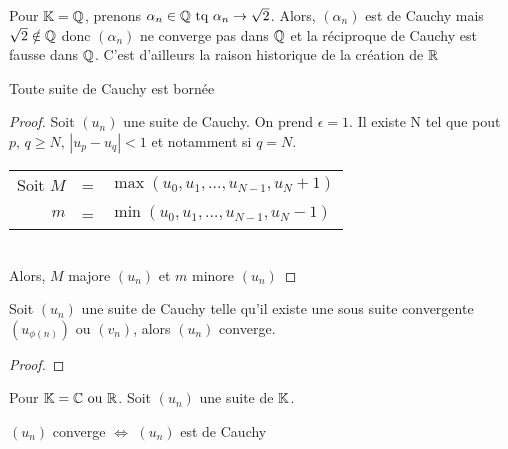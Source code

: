 \begin{rem}
Pour $\mathbb{K}=\mathbb{Q}$, prenons $\alpha_n\in\mathbb{Q}\text{~tq~}\alpha_n\to\sqrt{2}$. Alors, $(\alpha_n)$ est de Cauchy mais $\sqrt{2}\notin\mathbb{Q}$ donc $(\alpha_n)$ ne converge pas dans $\mathbb{Q}$ et la réciproque de Cauchy est fausse dans $\mathbb{Q}$. C'est d'ailleurs la raison historique de la création de $\mathbb{R}$
\end{rem}

\begin{lem}
Toute suite de Cauchy est bornée
\end{lem}
\begin{proof}
Soit $(u_n)$ une suite de Cauchy. On prend $\epsilon=1$. Il existe N tel que pout $p,\,q\geq N,\,|u_p-u_q|<1$ et notamment si $q=N$.

\begin{tabular}{rcl}
Soit $M$&=&$\max(u_0,u_1,\ldots,u_{N-1},u_N+1)$\\
	$m$&=&$\min(u_0,u_1,\ldots,u_{N-1},u_N-1)$\\
\end{tabular}\\
Alors, $M$ majore $(u_n)$ et $m$ minore $(u_n)$
\end{proof}

\begin{lem}
Soit $(u_n)$ une suite de Cauchy telle qu'il existe une sous suite convergente $(u_{\phi(n)})$ ou $(v_n)$, alors $(u_n)$ converge.
\end{lem}
\begin{proof}

\end{proof}

\begin{thm}
Pour $\mathbb{K} = \mathbb{C}\text{~ou~}\mathbb{R}$. Soit $(u_n)$ une suite de $\mathbb{K}$.\\
\begin{center}
	$(u_n)$ converge $\Leftrightarrow$ $(u_n)$ est de Cauchy
\end{center}
\end{thm}

